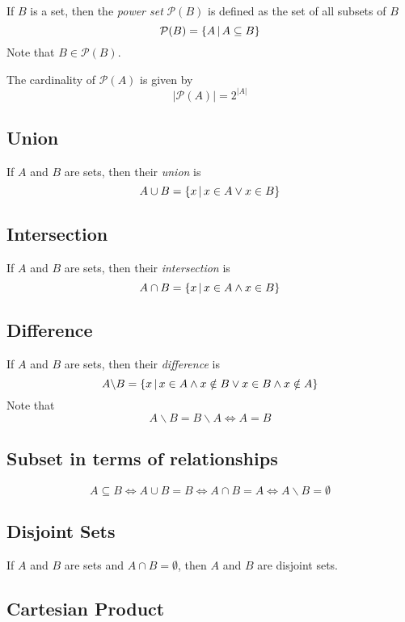 \documentclass[a4paper]{article}
\begin{document}
If \(B\) is a set, then the \textit{power set} \(\mathcal{P}(B)\)
is defined as the set of all subsets of \(B\)
\[
    \mathcal{P}(B)=\{A \,|\, A\subseteq B\}
\]
Note that \(B\in\mathcal{P}(B)\).

The cardinality of \(\mathcal{P}(A)\) is given by
\[
    |\mathcal{P}(A)| = 2^{|A|}
\]

\subsection{Union}

If \(A\) and \(B\) are sets, then their \textit{union} is
\[
    A \cup B = \{x \,|\, x \in A \lor x \in B\}
\]

\subsection{Intersection}

If \(A\) and \(B\) are sets, then their \textit{intersection} is
\[
    A \cap B = \{x \,|\, x \in A \land x \in B\}
\]

\subsection{Difference}

If \(A\) and \(B\) are sets, then their \textit{difference} is
\[
    A \backslash B = \{x \,|\, x \in A \land x \notin B \lor x \in B \land x \notin A\}
\]
Note that
\[
    A \backslash B = B \backslash A
    \iff A = B
\]

\subsection{Subset in terms of relationships}

\[
    A \subseteq B
    \iff
    A \cup B = B
    \iff
    A \cap B = A
    \iff
    A \backslash B = \emptyset
\]

\subsection{Disjoint Sets}

If \(A\) and \(B\) are sets and \(A \cap B = \emptyset \), then \(A\)
and \(B\) are disjoint sets.

\subsection{Cartesian Product}
\end{document}
